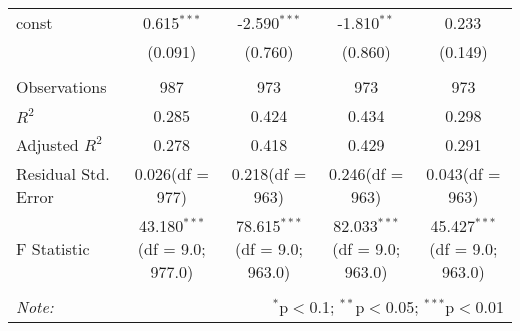 \begin{table}[!htbp]
\begin{tabular}{@{\extracolsep{5pt}}lcccc}
 const & 0.615$^{***}$ & -2.590$^{***}$ & -1.810$^{**}$ & 0.233$^{}$ \\
  & (0.091) & (0.760) & (0.860) & (0.149) \\
\hline \\[-1.8ex]
 Observations & 987 & 973 & 973 & 973 \\
 $R^2$ & 0.285 & 0.424 & 0.434 & 0.298 \\
 Adjusted $R^2$ & 0.278 & 0.418 & 0.429 & 0.291 \\
 Residual Std. Error & 0.026(df = 977) & 0.218(df = 963) & 0.246(df = 963) & 0.043(df = 963)  \\
 F Statistic & 43.180$^{***}$ (df = 9.0; 977.0) & 78.615$^{***}$ (df = 9.0; 963.0) & 82.033$^{***}$ (df = 9.0; 963.0) & 45.427$^{***}$ (df = 9.0; 963.0) \\
\hline
\hline \\[-1.8ex]
\textit{Note:} & \multicolumn{4}{r}{$^{*}$p$<$0.1; $^{**}$p$<$0.05; $^{***}$p$<$0.01} \\
\end{tabular}
\end{table}